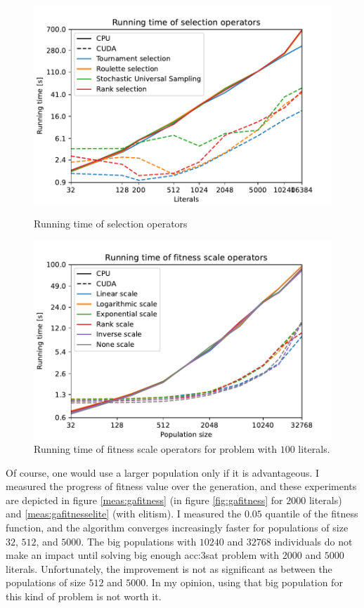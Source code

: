 \begin{figure}
    \begin{minipage}[t]{0.48\textwidth}
        \includegraphics[width=\textwidth]{img/runs/time_ga_selections_with_legend.pdf}
        \caption{Running time of selection operators}
        \label{fig:selectiontime}
    \end{minipage}
    \hfill
    \begin{minipage}[t]{0.48\textwidth}
        \includegraphics[width=\textwidth]{img/runs/time_ga_scale_100l_with_legend.pdf}
        \caption[Running time of fitness scale operators]{Running time of fitness scale operators for problem with $100$ literals.}
        \label{fig:gafitnessscaletime}
    \end{minipage}
\end{figure}


Of course, one would use a larger population only if it is advantageous. I measured the progress of fitness value over the generation, and these experiments are depicted in figure \ref{meas:gafitness} (in figure \ref{fig:gafitness} for $2000$ literals) and \ref{meas:gafitnesselite} (with elitism). I measured the $0.05$ quantile of the fitness function, and the algorithm converges increasingly faster for populations of size $32$, $512$, and $5000$. The big populations with $10240$ and $32768$ individuals do not make an impact until solving big enough \acrshort{acc:3sat} problem with $2000$ and $5000$ literals. Unfortunately, the improvement is not as significant as between the populations of size $512$ and $5000$. In my opinion, using that big population for this kind of problem is not worth it.

